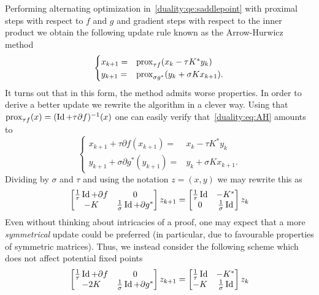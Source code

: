 Performing alternating optimization in~\eqref{duality:qe:saddlepoint} with proximal steps with respect to $f$ and $g$ and gradient steps with respect to the inner product we obtain the following update rule known as the Arrow-Hurwicz method
\begin{equation}\label{duality:eq:AH}
    \begin{cases}
        x_{k+1} =& \mathrm{prox}_{\tau f}(x_k-\tau K^*y_k)\\
        y_{k+1} =& \mathrm{prox}_{\sigma g^*}(y_k+\sigma Kx_{k+1}).
    \end{cases}
\end{equation}
It turns out that in this form, the method admits worse properties. In order to derive a better update we rewrite the algorithm in a clever way. Using that $\mathrm{prox}_{\tau f}(x) = (\operatorname{\mathrm{Id}} + \tau \partial f)^{-1}(x)$ one can easily verify that~\eqref{duality:eq:AH} amounts to
\begin{equation}
    \begin{cases}
        x_{k+1} +\tau \partial f(x_{k+1}) =& x_k - \tau K^*y_k\\
        y_{k+1} +\sigma \partial g^*(y_{k+1}) =& y_k + \sigma Kx_{k+1}.
    \end{cases}
\end{equation}
Dividing by $\sigma$ and $\tau$ and using the notation $z = (x,y)$ we may rewrite this as
\begin{equation}
    \begin{bmatrix}
        \frac{1}{\tau}\operatorname{\mathrm{Id}}+ \partial f&0\\
        -K&\frac{1}{\sigma}\operatorname{\mathrm{Id}} + \partial g^*
    \end{bmatrix}
    z_{k+1} = 
    \begin{bmatrix}
        \frac{1}{\tau}\operatorname{\mathrm{Id}}& - K^*\\
        0& \frac{1}{\sigma}\operatorname{\mathrm{Id}}
    \end{bmatrix}
    z_k
\end{equation}
Even without thinking about intricacies of a proof, one may expect that a more \emph{symmetrical} update could be preferred (in particular, due to favourable properties of symmetric matrices). Thus, we instead consider the following scheme which does not affect potential fixed points
\begin{equation}
    \begin{bmatrix}
        \frac{1}{\tau}\operatorname{\mathrm{Id}}+ \partial f&0\\
        -2K&\frac{1}{\sigma}\operatorname{\mathrm{Id}} + \partial g^*
    \end{bmatrix}
    z_{k+1} = 
    \begin{bmatrix}
        \frac{1}{\tau}\operatorname{\mathrm{Id}}& -K^*\\
        -K & \frac{1}{\sigma}\operatorname{\mathrm{Id}}
    \end{bmatrix}
    z_k
\end{equation}
